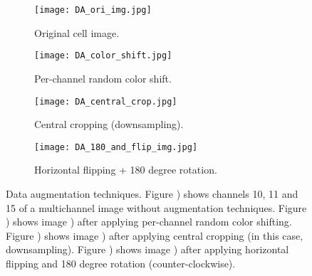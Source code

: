 \begin{figure}[htb]
  \centering
  \begin{subfigure}[b]{.45\linewidth}
    \texttt{[image: DA\_ori\_img.jpg]}
    \caption{Original cell image.}
    \label{fig:dataset:da:ori}
  \end{subfigure}
  \begin{subfigure}[b]{.45\linewidth}
    \texttt{[image: DA\_color\_shift.jpg]}
    \caption{Per-channel random color shift.}
    \label{fig:dataset:da:color_shift}
  \end{subfigure}%
  \vspace{3mm}
  \begin{subfigure}[b]{.45\linewidth}
    \texttt{[image: DA\_central\_crop.jpg]}
    \caption{Central cropping (downsampling).}
    \label{fig:dataset:da:central_crop}
  \end{subfigure}
  \begin{subfigure}[b]{.45\linewidth}
    \texttt{[image: DA\_180\_and\_flip\_img.jpg]}
    \caption{Horizontal flipping + 180 degree rotation.}
    \label{fig:dataset:da:rf}
  \end{subfigure}
  \caption{Data augmentation techniques. Figure ) shows channels 10, 11 and 15 of a multichannel image without augmentation techniques. Figure ) shows image ) after applying per-channel random color shifting. Figure ) shows image ) after applying central cropping (in this case, downsampling). Figure ) shows image ) after applying horizontal flipping and 180 degree rotation (counter-clockwise).}
  \label{fig:dataset:da}
\end{figure}
